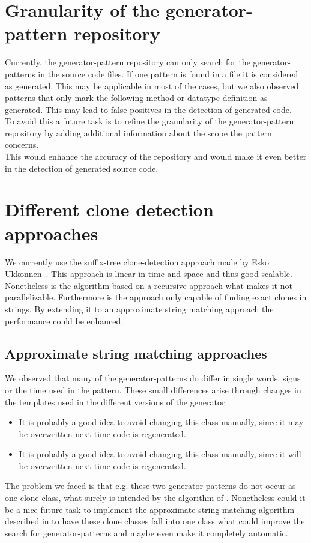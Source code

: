 \section{Granularity of the generator-pattern repository}
Currently, the generator-pattern repository can only search for the generator-patterns in the source code files. If one pattern is found in a file it is considered as generated. This may be applicable in most of the cases, but we also observed patterns that only mark the following method or datatype definition as generated. This may lead to false positives in the detection of generated code.\\
To avoid this a future task is to refine the granularity of the generator-pattern repository by adding additional information about the scope the pattern concerns. \\
This would enhance the accuracy of the repository and would make it even better in the detection of generated source code.

\section{Different clone detection approaches}
We currently use the suffix-tree clone-detection approach made by Esko Ukkonnen~\cite{Ukkonen1995}. This approach is linear in time and space and thus good scalable.\\
Nonetheless is the algorithm based on a recursive approach what makes it not parallelizable. Furthermore is the approach only capable of finding exact clones in strings. By extending it to an approximate string matching approach the performance could be enhanced.

\subsection{Approximate string matching approaches}
We observed that many of the generator-patterns do differ in single words, signs or the time used in the pattern. These small differences arise through changes in the templates used in the different versions of the generator. 
\begin{itemize}
	\item It is probably a good idea to avoid changing this class manually, since it \textcolor{TUMAccentOrange}{may} be overwritten next time code is regenerated.
	\item It is probably a good idea to avoid changing this class manually, since it \textcolor{TUMAccentOrange}{will} be overwritten next time code is regenerated.
\end{itemize}
The problem we faced is that e.g. these two generator-patterns do not occur as one clone class, what surely is intended by the algorithm of \cite{Ukkonen1995}. Nonetheless could it be a nice future task to implement the approximate string matching algorithm described in \cite{Ukkonen1993} to have these clone classes fall into one class what could improve the search for generator-patterns and maybe even make it completely automatic.

